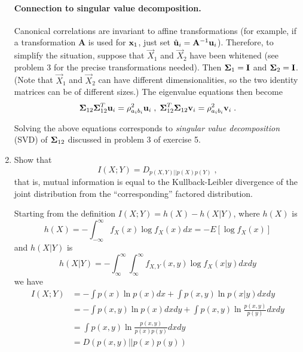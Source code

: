 \begin{enumerate}
\begin{solution}
    \paragraph{Connection to singular value decomposition.}
    Canonical correlations are invariant to affine transformations (for example,
    if a transformation $\mathbf{A}$ is used for $\mathbf{x}_1$, just set $\hat {\mathbf{u}}_i=\mathbf{A}^{-1}\mathbf{u}_i$).
    Therefore, to simplify the situation, suppose that $\vec{X}_1$ and $\vec{X}_2$ have been whitened
    (see problem 3 for the precise transformations needed).
    Then $\boldsymbol{\Sigma}_1=\mathbf{I}$ and $\boldsymbol{\Sigma}_2=\mathbf{I}$. (Note that $\vec{X}_1$ and $\vec{X}_2$
    can have different dimensionalities, so the two identity matrices can be of different sizes.)
    The eigenvalue equations then become
    \begin{equation}\label{eq:temp1}
      \boldsymbol{\Sigma}_{12}\boldsymbol{\Sigma}_{12}^T\mathbf{u}_i=\rho^2_{a_i b_i}\mathbf{u}_i\;,\;
      \boldsymbol{\Sigma}_{12}^T\boldsymbol{\Sigma}_{12}\mathbf{v}_i=\rho^2_{a_i b_i}\mathbf{v}_i \;.
    \end{equation}

    Solving the above equations corresponds to \emph{singular value decomposition} (SVD)
    of $\boldsymbol{\Sigma}_{12}$ discussed  in problem 3 of exercise 5.
  \end{solution}
  
\item Show that
  \begin{displaymath}
    I(X;Y) = D_{p(X,Y)||p(X)p(Y)} \; ,
  \end{displaymath}
  that is, mutual information is equal to the Kullback-Leibler
  divergence of the joint distribution from the ``corresponding''
  factored distribution.

  \begin{solution}

    Starting from the definition $I(X; Y) = h(X) - h(X | Y)$, where $h(X)$
    is
    \[
    h(X) = -\int_{-\infty}^{\infty} f_X(x) \log f_X(x)dx = -E[\log f_X(x)]
    \] 
    and $h(X|Y)$ is
    \[
    h(X|Y)=-\int_{\infty}^{\infty}\int_{\infty}^{\infty}f_{X,Y}(x,y)\log
    f_X(x|y) dx dy
    \]
    we have
    \begin{equation}
      \begin{split}
        I(X; Y) &= -\int p(x) \ln p(x) dx + \int p(x, y) \ln p(x | y) dx dy\\ 
        &= -\int p(x, y) \ln p(x) dx dy + \int p(x, y) \ln \frac{p(x, y)}{p(y)} dx dy\\ 
        &= \int p(x, y) \ln \frac{p(x, y)}{p(x) p(y)} dx dy \\
        &= D(p(x, y) || p(x)p(y))
      \end{split}
    \end{equation}



\end{solution}
\end{enumerate}
